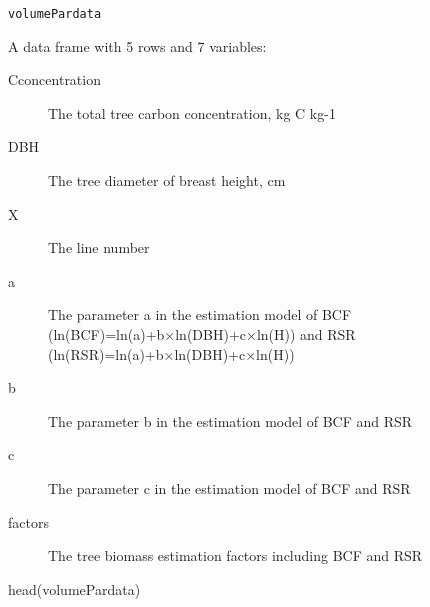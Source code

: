\documentclass[a4paper]{book}
\begin{document}
%
\begin{Usage}
\begin{verbatim}
volumePardata
\end{verbatim}
\end{Usage}
%
\begin{Format}
A data frame with 5 rows and 7 variables:
\begin{description}

\item[Cconcentration] The total tree carbon concentration, kg C kg-1
\item[DBH] The tree diameter of breast height, cm
\item[X] The line number
\item[a] The parameter a in the estimation model of BCF (ln(BCF)=ln(a)+b×ln(DBH)+c×ln(H)) and RSR (ln(RSR)=ln(a)+b×ln(DBH)+c×ln(H))
\item[b] The parameter b in the estimation model of BCF and RSR
\item[c] The parameter c in the estimation model of BCF and RSR
\item[factors] The tree biomass estimation factors including BCF and RSR

\end{description}

\end{Format}
%
\begin{Examples}
\begin{ExampleCode}
head(volumePardata)
\end{ExampleCode}
\end{Examples}
\printindex{}
\end{document}
